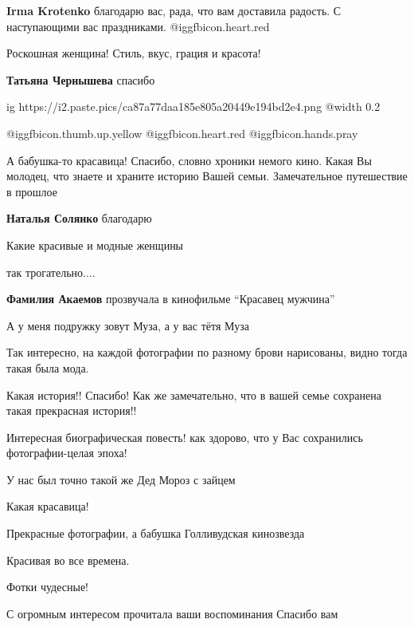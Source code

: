 \begin{itemize}
\textbf{Irma Krotenko} благодарю вас, рада, что вам доставила радость. С наступающими вас праздниками. @igg{fbicon.heart.red}

Роскошная женщина! Стиль, вкус, грация и красота!

\textbf{Татьяна Чернышева} спасибо


\ifcmt
  ig https://i2.paste.pics/ca87a77daa185e805a20449e194bd2e4.png
  @width 0.2
\fi

 @igg{fbicon.thumb.up.yellow} @igg{fbicon.heart.red} @igg{fbicon.hands.pray} 


А бабушка-то красавица! Спасибо, словно хроники немого кино. Какая Вы молодец,
что знаете и храните историю Вашей семьи. Замечательное путешествие в прошлое


\textbf{Наталья Солянко} благодарю

Какие красивые и модные женщины

так трогательно....

\textbf{Фамилия Акаемов} прозвучала в кинофильме \enquote{Красавец мужчина}

А у меня подружку зовут Муза, а у вас тётя Муза

Так интересно, на каждой фотографии по разному брови нарисованы, видно тогда такая была мода.

Какая история!! Спасибо! Как же замечательно, что в вашей семье сохранена такая прекрасная история!!

Интересная биографическая повесть! как здорово, что у Вас сохранились
фотографии-целая эпоха!

У нас был точно такой же Дед Мороз с зайцем

Какая красавица!

Прекрасные фотографии, а бабушка Голливудская кинозвезда

Красивая во все времена.

Фотки чудесные!

С огромным интересом прочитала ваши воспоминания
Спасибо вам


\end{itemize}
